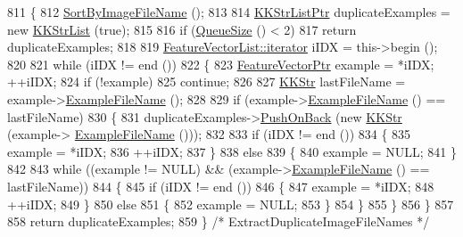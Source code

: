 \begin{DoxyCode}
811 \{
812   \hyperlink{class_k_k_m_l_l_1_1_feature_vector_list_a3cfb8424a49a64301f25433e36446038}{SortByImageFileName} ();
813 
814   \hyperlink{class_k_k_b_1_1_k_k_str_list}{KKStrListPtr}  duplicateExamples = \textcolor{keyword}{new} \hyperlink{class_k_k_b_1_1_k_k_str_list}{KKStrList} (\textcolor{keyword}{true});
815 
816   \textcolor{keywordflow}{if}  (\hyperlink{class_k_k_b_1_1_k_k_queue_a1dab601f75ee6a65d97f02bddf71c40d}{QueueSize} () < 2)
817     \textcolor{keywordflow}{return}  duplicateExamples;
818 
819   \hyperlink{class_k_k_b_1_1_k_k_queue_aa3c2796a726eea468b94132a9fbf2cfe}{FeatureVectorList::iterator}  iIDX = this->begin ();
820 
821   \textcolor{keywordflow}{while}  (iIDX != end ())
822   \{
823     \hyperlink{class_k_k_m_l_l_1_1_feature_vector}{FeatureVectorPtr}  example = *iIDX;  ++iIDX;
824     \textcolor{keywordflow}{if}  (!example)
825       \textcolor{keywordflow}{continue};
826 
827     \hyperlink{class_k_k_b_1_1_k_k_str}{KKStr}  lastFileName = example->\hyperlink{class_k_k_m_l_l_1_1_feature_vector_ab47c89ab1e9396664fdc0dc34b6e1ab5}{ExampleFileName} ();
828 
829     \textcolor{keywordflow}{if}  (example->\hyperlink{class_k_k_m_l_l_1_1_feature_vector_ab47c89ab1e9396664fdc0dc34b6e1ab5}{ExampleFileName} () == lastFileName)
830     \{
831       duplicateExamples->\hyperlink{class_k_k_b_1_1_k_k_queue_aa9fba4632b54268bf71ecb42dee0b575}{PushOnBack} (\textcolor{keyword}{new} \hyperlink{class_k_k_b_1_1_k_k_str}{KKStr} (example->
      \hyperlink{class_k_k_m_l_l_1_1_feature_vector_ab47c89ab1e9396664fdc0dc34b6e1ab5}{ExampleFileName} ()));
832 
833       \textcolor{keywordflow}{if}  (iIDX != end ())
834       \{
835         example = *iIDX;
836         ++iIDX; 
837       \}
838       \textcolor{keywordflow}{else}
839       \{
840         example = NULL;
841       \}
842 
843       \textcolor{keywordflow}{while}  ((example != NULL)   &&   (example->\hyperlink{class_k_k_m_l_l_1_1_feature_vector_ab47c89ab1e9396664fdc0dc34b6e1ab5}{ExampleFileName} () == lastFileName))
844       \{
845         \textcolor{keywordflow}{if}  (iIDX != end ())
846         \{
847           example = *iIDX;
848           ++iIDX;
849         \}
850         \textcolor{keywordflow}{else}
851         \{
852           example = NULL;
853         \}
854       \}
855     \}
856   \}
857 
858   \textcolor{keywordflow}{return}  duplicateExamples;
859 \}  \textcolor{comment}{/*  ExtractDuplicateImageFileNames  */}
\end{DoxyCode}
